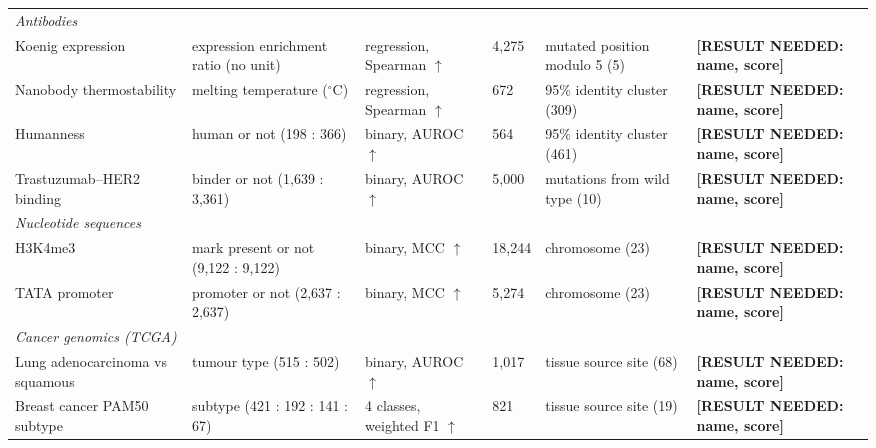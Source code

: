 \begin{table}[htbp]
\begin{tabular}{p{2.6cm}p{2.5cm}p{2.0cm}p{1.0cm}p{2.4cm}p{2.4cm}}
\midrule
\multicolumn{6}{l}{\textit{Antibodies}} \\
Koenig expression \citep{Koenig2017, Chungyoun2024} & expression enrichment ratio (no unit) & regression, Spearman $\uparrow$ & 4,275 & mutated position modulo 5 (5) & \textbf{[RESULT NEEDED: name, score]} \\
Nanobody thermostability \citep{ValdesTresanco2023, Chungyoun2024} & melting temperature ($^\circ$C) & regression, Spearman $\uparrow$ & 672 & 95\% identity cluster (309) & \textbf{[RESULT NEEDED: name, score]} \\
Humanness \citep{Prihoda2022} & human or not (198 : 366) & binary, AUROC $\uparrow$ & 564 & 95\% identity cluster (461) & \textbf{[RESULT NEEDED: name, score]} \\
Trastuzumab--HER2 binding \citep{Chinery2024} & binder or not (1,639 : 3,361) & binary, AUROC $\uparrow$ & 5,000 & mutations from wild type (10) & \textbf{[RESULT NEEDED: name, score]} \\
\midrule
\multicolumn{6}{l}{\textit{Nucleotide sequences}} \\
H3K4me3 \citep{DallaTorre2025} & mark present or not (9,122 : 9,122) & binary, MCC $\uparrow$ & 18,244 & chromosome (23) & \textbf{[RESULT NEEDED: name, score]} \\
TATA promoter \citep{DallaTorre2025} & promoter or not (2,637 : 2,637) & binary, MCC $\uparrow$ & 5,274 & chromosome (23) & \textbf{[RESULT NEEDED: name, score]} \\
\midrule
\multicolumn{6}{l}{\textit{Cancer genomics (TCGA)}} \\
Lung adenocarcinoma vs squamous \citep{TCGA2014LUAD, TCGA2012LUSC, Goldman2020} & tumour type (515 : 502) & binary, AUROC $\uparrow$ & 1,017 & tissue source site (68) & \textbf{[RESULT NEEDED: name, score]} \\
Breast cancer PAM50 subtype \citep{TCGA2012BRCA, Parker2009, Goldman2020} & subtype (421 : 192 : 141 : 67) & 4 classes, weighted F1 $\uparrow$ & 821 & tissue source site (19) & \textbf{[RESULT NEEDED: name, score]} \\
\bottomrule
\end{tabular}
\end{table}

